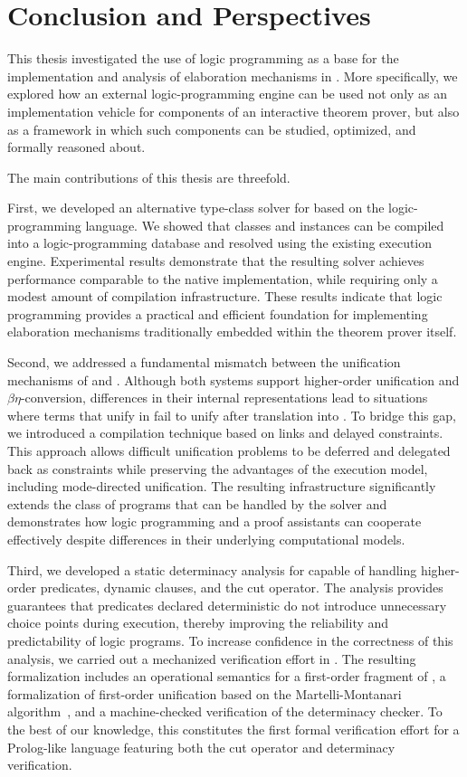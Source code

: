 \chapter{Conclusion and Perspectives}

This thesis investigated the use of logic programming as a base for the
implementation and analysis of elaboration mechanisms in \rocq. More
specifically, we explored how an external logic-programming engine can be used
not only as an implementation vehicle for components of an interactive theorem
prover, but also as a framework in which such components can be studied,
optimized, and formally reasoned about.

The main contributions of this thesis are threefold.

First, we developed an alternative type-class solver for \rocq based on the
\elpi logic-programming language. We showed that classes and instances can be
compiled into a logic-programming database and resolved using the existing
\elpi execution engine. Experimental results demonstrate that the resulting
solver achieves performance comparable to the native \rocq implementation,
while requiring only a modest amount of compilation infrastructure. These
results indicate that logic programming provides a practical and efficient
foundation for implementing elaboration mechanisms traditionally embedded
within the theorem prover itself.

Second, we addressed a fundamental mismatch between the unification mechanisms
of \rocq and \elpi. Although both systems support higher-order unification and
$\beta\eta$-conversion, differences in their internal representations lead to
situations where terms that unify in \rocq fail to unify after translation into
\elpi. To bridge this gap, we introduced a compilation technique based on links
and delayed constraints. This approach allows difficult unification problems to
be deferred and delegated back as constraints while preserving
the advantages of the \elpi execution model, including mode-directed
unification. The resulting infrastructure significantly extends the class of
programs that can be handled by the solver and demonstrates how logic
programming and a proof assistants can cooperate effectively despite
differences in their underlying computational models.

Third, we developed a static determinacy analysis for \elpi capable of handling
higher-order predicates, dynamic clauses, and the cut operator. The analysis
provides guarantees that predicates declared deterministic do not introduce
unnecessary choice points during execution, thereby improving the reliability
and predictability of logic programs. To increase confidence in the correctness
of this analysis, we carried out a mechanized verification effort in \rocq.
The resulting formalization includes an operational semantics for a
first-order fragment of \elpi, a formalization of first-order unification based
on the Martelli-Montanari algorithm~\cite{montanari82}, and a machine-checked
verification of the determinacy checker. To the best of our knowledge, this
constitutes the first formal verification effort for a Prolog-like language
featuring both the cut operator and determinacy verification.

